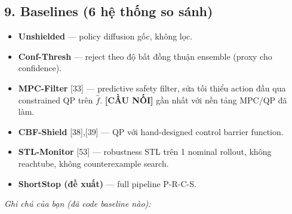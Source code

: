 \documentclass[a4paper,12pt]{article}
\newcommand{\bridge}{\textcolor{blue!50!black}{\textbf{[CẦU NỐI]}}}
\begin{document}
\subsection*{9. Baselines (6 hệ thống so sánh)}
\begin{itemize}
  \item \textbf{Unshielded} — policy diffusion gốc, không lọc.
  \item \textbf{Conf-Thresh} — reject theo độ bất đồng thuận ensemble (proxy cho confidence).
  \item \textbf{MPC-Filter} [33] — predictive safety filter, sửa tối thiểu action đầu qua constrained QP trên $\hat f$. \bridge{} gần nhất với nền tảng MPC/QP đã làm.
  \item \textbf{CBF-Shield} [38],[39] — QP với hand-designed control barrier function.
  \item \textbf{STL-Monitor} [53] — robustness STL trên 1 nominal rollout, không reachtube, không counterexample search.
  \item \textbf{ShortStop (đề xuất)} — full pipeline P-R-C-S.
\end{itemize}
\begin{tasklist}
  \item[\square] \textit{Ghi chú của bạn (đã code baseline nào):} \underline{\hspace{10cm}}
\end{tasklist}
\end{document}
